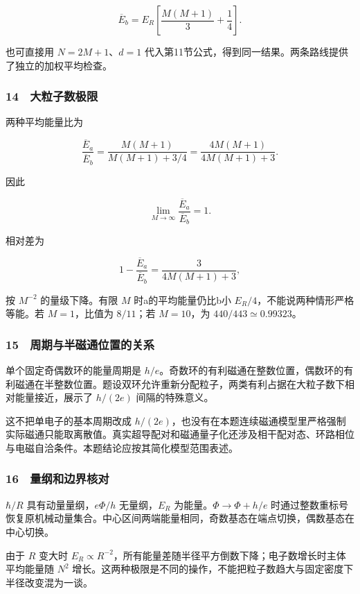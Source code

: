 \documentclass[12pt,a4paper,fontset=fandol]{ctexart}
\begin{document}
\[\boxed{\overline E_b=E_R\left[\frac{M(M+1)}3+\frac14\right].}\]

也可直接用 \(N=2M+1\)、\(d=1\)
代入第11节公式，得到同一结果。两条路线提供了独立的加权平均检查。

\subsubsection{14　大粒子数极限}\label{ux5927ux7c92ux5b50ux6570ux6781ux9650}

两种平均能量比为

\[\boxed{\frac{\overline E_a}{\overline E_b}
=\frac{M(M+1)}{M(M+1)+3/4}
=\frac{4M(M+1)}{4M(M+1)+3}.}\]

因此

\[\boxed{\lim_{M\to\infty}
\frac{\overline E_a}{\overline E_b}=1.}\]

相对差为

\[1-\frac{\overline E_a}{\overline E_b}
=\frac3{4M(M+1)+3},\]

按 \(M^{-2}\) 的量级下降。有限 \(M\) 时a的平均能量仍比b小
\(E_R/4\)，不能说两种情形严格等能。若 \(M=1\)，比值为 \(8/11\)；若
\(M=10\)，为 \(440/443\simeq0.99323\)。

\subsubsection{15　周期与半磁通位置的关系}\label{ux5468ux671fux4e0eux534aux78c1ux901aux4f4dux7f6eux7684ux5173ux7cfb}

单个固定奇偶数环的能量周期是
\(h/e\)。奇数环的有利磁通在整数位置，偶数环的有利磁通在半整数位置。题设双环允许重新分配粒子，两类有利占据在大粒子数下相对能量接近，展示了
\(h/(2e)\) 间隔的特殊意义。

这不把单电子的基本周期改成
\(h/(2e)\)，也没有在本题连续磁通模型里严格强制实际磁通只能取离散值。真实超导配对和磁通量子化还涉及相干配对态、环路相位与电磁自洽条件。本题结论应按其简化模型范围表述。

\subsubsection{16　量纲和边界核对}\label{ux91cfux7eb2ux548cux8fb9ux754cux6838ux5bf9}

\(\hbar/R\) 具有动量量纲，\(e\Phi/h\) 无量纲，\(E_R\)
为能量。\(\Phi\to\Phi+h/e\)
时通过整数重标号恢复原机械动量集合。中心区间两端能量相同，奇数基态在端点切换，偶数基态在中心切换。

由于 \(R\) 变大时
\(E_R\propto R^{-2}\)，所有能量差随半径平方倒数下降；电子数增长时主体平均能量随
\(N^2\)
增长。这两种极限是不同的操作，不能把粒子数趋大与固定密度下半径改变混为一谈。
\end{document}
